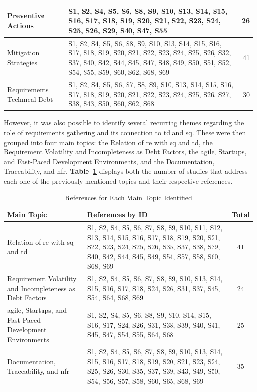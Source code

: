 \documentclass[12pt,reqno, twoside]{amsbook}
\theoremstyle{plain}
\numberwithin{equation}{chapter}
\newcommand{\tabref}[1]{\textbf{Table~\ref{#1}}}
\numberwithin{section}{chapter}
\begin{document}
\begin{table}[htbp]
{\begin{tabular}{|p{5cm}|p{9cm}|r|}
Preventive Actions &
S1, S2, S4, S5, S6, S8, S9, S10, S13, S14, S15, S16, S17, S18, S19, S20, S21, S22, S23, S24, S25, S26, S29, S40, S47, S55
& 26 \\ \hline

Mitigation Strategies &
S1, S2, S4, S5, S6, S8, S9, S10, S13, S14, S15, S16, S17, S18, S19, S20, S21, S22, S23, S24, S25, S26, S32, S37, S40, S42, S44, S45, S47, S48, S49, S50, S51, S52, S54, S55, S59, S60, S62, S68, S69
& 41 \\ \hline

Requirements Technical Debt &
S1, S2, S4, S5, S6, S7, S8, S9, S10, S13, S14, S15, S16, S17, S18, S19, S20, S21, S22, S23, S24, S25, S26, S27, S38, S43, S50, S60, S62, S68
& 30 \\ \hline
\end{tabular}}
\end{table}

\noindent However, it was also possible to identify several recurring themes regarding the role of requirements gathering and its connection to \gls{td} and \gls{sq}. These were then grouped into four main topics: the Relation of \gls{re} with \gls{sq} and \gls{td}, the Requirement Volatility and Incompleteness as Debt Factors, the agile, Startups, and Fast-Paced Development Environments, and the Documentation, Traceability, and \gls{nfr}. \tabref{tab:main_topics} displays both the number of studies that address each one of the previously mentioned topics and their respective references.

\begin{table}[htbp]
\centering
\caption{References for Each Main Topic Identified}
\label{tab:main_topics}
\begin{tabular}{|p{7cm}|p{6cm}|c|}
\hline
\textbf{Main Topic} & \textbf{References by ID} & \textbf{Total} \\ \hline

Relation of \gls{re} with \gls{sq} and \gls{td} &
S1, S2, S4, S5, S6, S7, S8, S9, S10, S11, S12, S13, S14, S15, S16, S17, S18, S19, S20, S21, S22, S23, S24, S25, S26, S35, S37, S38, S39, S40, S42, S44, S45, S49, S54, S57, S58, S60, S68, S69
& 41 \\ \hline

Requirement Volatility and Incompleteness as Debt Factors &
S1, S2, S4, S5, S6, S7, S8, S9, S10, S13, S14, S15, S16, S17, S18, S24, S26, S31, S37, S45, S54, S64, S68, S69
& 24 \\ \hline

agile, Startups, and Fast-Paced Development Environments &
S1, S2, S4, S5, S6, S8, S9, S10, S14, S15, S16, S17, S24, S26, S31, S38, S39, S40, S41, S45, S47, S54, S55, S64, S68
& 25 \\ \hline

Documentation, Traceability, and \gls{nfr} &
S1, S2, S4, S5, S6, S7, S8, S9, S10, S13, S14, S15, S16, S17, S18, S19, S20, S21, S23, S24, S25, S26, S30, S35, S37, S39, S43, S49, S50, S54, S56, S57, S58, S60, S65, S68, S69
& 35 \\ \hline

\end{tabular}
\end{table}
\end{document}
